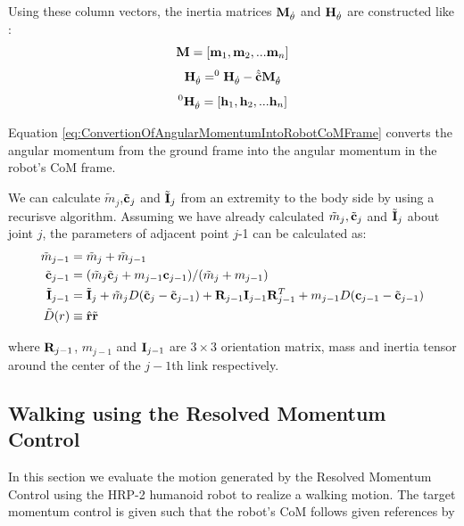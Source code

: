 Using these column vectors, the inertia matrices ${\bf M}_{\dot{\theta}}$ and
${\bf H}_{\dot{\theta}}$ are constructed like :
\begin{equation}
{\bf M} =  [ {\bf m}_1, {\bf m}_2, ... {\bf m}_n] \\
\end{equation}
\begin{equation}
{\bf H}_{\dot{\theta}} = ^{0}{\bf H}_{\dot{\theta}} - \hat{\tilde{\bf c}} {\bf M}_{\dot{\theta}} \\
\label{eq:ConvertionOfAngularMomentumIntoRobotCoMFrame}
\end{equation}
\begin{equation}
^{0}{\bf H}_{\dot{\theta}} =  [ {\bf h}_1, {\bf h}_2, ... {\bf h}_n] \\
\end{equation}

Equation \ref{eq:ConvertionOfAngularMomentumIntoRobotCoMFrame} converts the angular
momentum from the ground frame into the angular momentum in the robot's CoM frame.
\par
We can calculate $\tilde{m}_j$,$\tilde{\bf c}_j$ and $\tilde{\bf I}_j$ from an
extremity to the body side by using a recurisve algorithm. Assuming we have
already calculated $\tilde{m}_j, \tilde{\bf c}_j$ and $\tilde{\bf I}_j$ about joint $j$,
the parameters of adjacent point $j$-1  can be calculated as:
\begin{equation}
\begin{aligned}
\tilde{m}_{j-1} & = \tilde{m}_j + \tilde{m}_{j-1}\\
\tilde{\bf c}_{j-1} & = ( \tilde{m}_j\tilde{\bf c}_j + m_{j-1}{\bf c}_{j-1})/(\tilde{m}_j + m_{j-1}) \\
\tilde{\bf I}_{j-1} &= \tilde{\bf I}_j + \tilde{m}_j D (\tilde{\bf c}_j - \tilde{\bf c}_{j-1})
		+ {\bf R}_{j-1}{\bf I}_{j-1} {\bf R}^T_{j-1}
	+ m_{j-1} D ({\bf c}_{j-1} - \tilde{\bf c}_{j-1})\\
\tilde D(r) & \equiv \hat{\bf r}\tilde{\bf r}\\
\end{aligned}
\end{equation}

where ${\bf R}_{j-1}$, $m_{j-1}$ and ${\bf I}_{j-1}$ are $3 \times 3$ orientation matrix, mass
and inertia tensor around the center of the $j-1$th link respectively.


\subsection{Walking using the Resolved Momentum Control}
In this section we evaluate the motion generated by the Resolved Momentum Control
using the HRP-2 humanoid robot to realize a walking motion.
The target momentum control is given such that the robot's CoM follows
given references by

